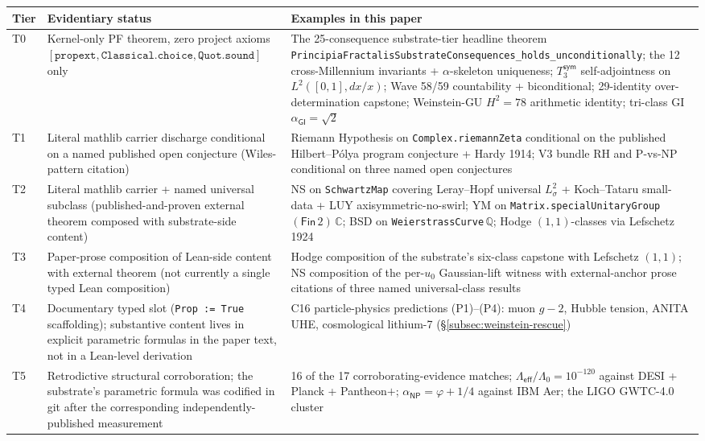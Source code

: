 \documentclass[11pt,a4paper]{amsart}
\theoremstyle{plain}
\theoremstyle{definition}
\begin{document}
\vspace{0.5em}
\begin{center}
\small
\begin{tabular}{@{}p{}p{}p{}@{}}
\toprule
\textbf{Tier} & \textbf{Evidentiary status} & \textbf{Examples in this paper} \\
\midrule
T0 & Kernel-only PF theorem, zero project axioms $[\texttt{propext}, \texttt{Classical.choice}, \texttt{Quot.sound}]$ only & The 25-consequence substrate-tier headline theorem \texttt{PrincipiaFractalisSubstrateConsequences\_holds\_unconditionally}; the 12 cross-Millennium invariants + $\alpha$-skeleton uniqueness; $T_3^{\textsf{sym}}$ self-adjointness on $L^2([0,1], dx/x)$; Wave 58/59 countability + biconditional; 29-identity over-determination capstone; Weinstein-GU $H^2 = 78$ arithmetic identity; tri-class GI $\alpha_{\textsf{GI}} = \sqrt{2}$ \\
T1 & Literal mathlib carrier discharge conditional on a named published open conjecture (Wiles-pattern citation) & Riemann Hypothesis on \texttt{Complex.riemannZeta} conditional on the published Hilbert--P\'olya program conjecture + Hardy 1914; V3 bundle RH and P-vs-NP conditional on three named open conjectures \\
T2 & Literal mathlib carrier + named universal subclass (published-and-proven external theorem composed with substrate-side content) & NS on \texttt{SchwartzMap} covering Leray--Hopf universal $L^2_\sigma$ + Koch--Tataru small-data + LUY axisymmetric-no-swirl; YM on \texttt{Matrix.specialUnitaryGroup} $(\textsf{Fin}\,2)\,\mathbb{C}$; BSD on \texttt{WeierstrassCurve}\,$\mathbb{Q}$; Hodge $(1,1)$-classes via Lefschetz 1924 \\
T3 & Paper-prose composition of Lean-side content with external theorem (not currently a single typed Lean composition) & Hodge composition of the substrate's six-class capstone with Lefschetz $(1,1)$; NS composition of the per-$u_0$ Gaussian-lift witness with external-anchor prose citations of three named universal-class results \\
T4 & Documentary typed slot (\texttt{Prop := True} scaffolding); substantive content lives in explicit parametric formulas in the paper text, not in a Lean-level derivation & C16 particle-physics predictions (P1)--(P4): muon $g\!-\!2$, Hubble tension, ANITA UHE, cosmological lithium-7 (\S\ref{subsec:weinstein-rescue}) \\
T5 & Retrodictive structural corroboration; the substrate's parametric formula was codified in git after the corresponding independently-published measurement & 16 of the 17 corroborating-evidence matches; $\Lambda_{\textsf{eff}}/\Lambda_0 = 10^{-120}$ against DESI + Planck + Pantheon$+$; $\alpha_{\textsf{NP}} = \varphi+1/4$ against IBM Aer; the LIGO GWTC-4.0 cluster \\

\end{tabular}
\end{center}
\end{document}
